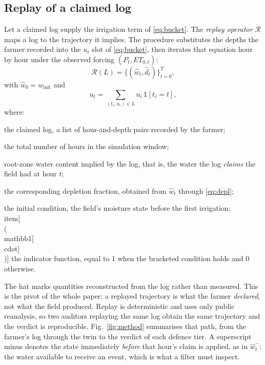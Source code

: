 \subsection{Replay of a claimed log}
\label{sec:replay}

Let a claimed log supply the irrigation term of \eqref{eq:bucket}. The \emph{replay operator} $\mathcal{R}$ maps a log to the trajectory it implies. The
procedure substitutes the depths the farmer recorded into the $u_t$ slot of
\eqref{eq:bucket}, then iterates that equation hour by hour under the observed
forcing $(P_t,ET_{0,t})$:
\begin{equation}
\mathcal{R}(L)=\{(\hat w_t,\hat d_t)\}_{t=0}^{T},
\label{eq:replay}
\end{equation}
with $\hat w_0=w_{\mathrm{init}}$ and
\begin{equation}
u_t=\sum_{(t_i,u_i)\in L}u_i\,\mathbb{1}[t_i=t],
\label{eq:uterm}
\end{equation}
where:
\begin{symbolist}
\item[$L$] the claimed log, a list of hour-and-depth pairs recorded by the farmer;
\item[$T$] the total number of hours in the simulation window;
\item[$\hat w_t$] root-zone water content implied by the log, that is, the water the
  log \emph{claims} the field had at hour $t$;
\item[$\hat d_t$] the corresponding depletion fraction, obtained from $\hat w_t$
  through \eqref{eq:depl};
\item[$\hat w_0=w_{\mathrm{init}}$] the initial condition, the field's moisture
  state before the first irrigation;
\\item[{\\(\\mathbb{1}[\\cdot]\\)}] the indicator function, equal to 1 when the bracketed condition holds and 0
  otherwise.
\end{symbolist}

The hat marks quantities reconstructed from the log rather than measured. This is the
pivot of the whole paper: a replayed trajectory is what the farmer \emph{declared},
not what the field produced. Replay is
deterministic and uses only public reanalysis, so two auditors replaying the
same log obtain the same trajectory and the verdict is reproducible. Fig.~\ref{fig:method} summarises that path, from the farmer's log through the twin to the verdict of each defence tier. A
superscript minus denotes the state immediately \emph{before} that hour's
claim is applied, as in $\hat w_{t}^{-}$: the water available to receive an
event, which is what a filter must inspect.

